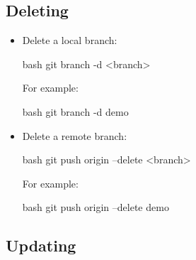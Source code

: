 \subsection{Deleting}

\begin{itemize}
    \item Delete a local branch:
    \begin{mintedbox}{bash}
git branch -d <branch>
    \end{mintedbox}
    For example:
    \begin{mintedbox}{bash}
git branch -d demo
    \end{mintedbox}
    \item Delete a remote branch:
    \begin{mintedbox}{bash}
git push origin --delete <branch>
    \end{mintedbox}
    For example:
    \begin{mintedbox}{bash}
git push origin --delete demo
    \end{mintedbox}
\end{itemize}


\subsection{Updating}

